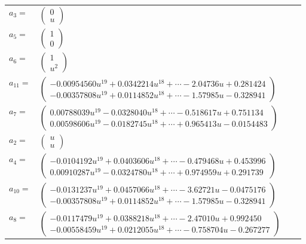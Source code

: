 \documentclass[1p]{elsarticle_modified}
\theoremstyle{definition}
\begin{document}
\begin{tabular}{m{7pt} m{180pt} m{7pt} m{180pt} }
\flushright $a_{3}=$&$\begin{pmatrix}0\\u\end{pmatrix}$ \\
\flushright $a_{5}=$&$\begin{pmatrix}1\\0\end{pmatrix}$ \\
\flushright $a_{6}=$&$\begin{pmatrix}1\\u^2\end{pmatrix}$ \\
\flushright $a_{11}=$&$\begin{pmatrix}-0.00954560 u^{19}+0.0342214 u^{18}+\cdots-2.04736 u+0.281424\\-0.00357808 u^{19}+0.0114852 u^{18}+\cdots-1.57985 u-0.328941\end{pmatrix}$ \\
\flushright $a_{7}=$&$\begin{pmatrix}0.00788039 u^{19}-0.0328040 u^{18}+\cdots-0.518617 u+0.751134\\0.00598606 u^{19}-0.0182745 u^{18}+\cdots+0.965413 u-0.0154483\end{pmatrix}$ \\
\flushright $a_{2}=$&$\begin{pmatrix}u\\u\end{pmatrix}$ \\
\flushright $a_{4}=$&$\begin{pmatrix}-0.0104192 u^{19}+0.0403606 u^{18}+\cdots-0.479468 u+0.453996\\0.00910287 u^{19}-0.0324780 u^{18}+\cdots+0.974959 u+0.291739\end{pmatrix}$ \\
\flushright $a_{10}=$&$\begin{pmatrix}-0.0131237 u^{19}+0.0457066 u^{18}+\cdots-3.62721 u-0.0475176\\-0.00357808 u^{19}+0.0114852 u^{18}+\cdots-1.57985 u-0.328941\end{pmatrix}$ \\
\flushright $a_{8}=$&$\begin{pmatrix}-0.0117479 u^{19}+0.0388218 u^{18}+\cdots-2.47010 u+0.992450\\-0.00558459 u^{19}+0.0212055 u^{18}+\cdots-0.758704 u-0.267277\end{pmatrix}$ \\

\end{tabular}
\end{document}
